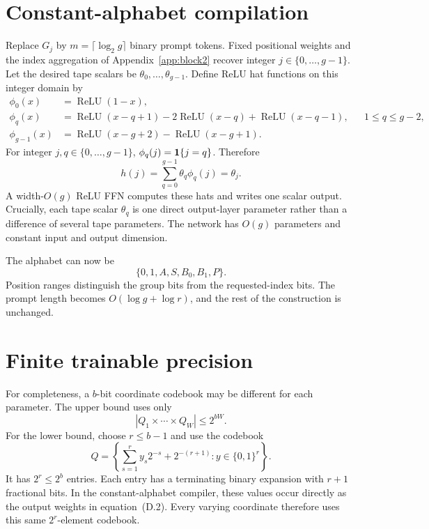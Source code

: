 \section{Constant-alphabet compilation}\label{app:constant-alphabet}

Replace $G_j$ by $m=\lceil\log_2g\rceil$ binary prompt tokens. Fixed positional weights and the
index aggregation of Appendix~\ref{app:block2} recover integer $j\in\{0,\ldots,g-1\}$. Let the
desired tape scalars be $\theta_0,\ldots,\theta_{g-1}$. Define ReLU hat functions on this integer
domain by
\begin{align}
 \phi_0(x)&=\operatorname{ReLU}(1-x),\nonumber\\
 \phi_q(x)&=\operatorname{ReLU}(x-q+1)-2\operatorname{ReLU}(x-q)
 +\operatorname{ReLU}(x-q-1), &&1\leq q\leq g-2,\nonumber\\
 \phi_{g-1}(x)&=\operatorname{ReLU}(x-g+2)-\operatorname{ReLU}(x-g+1).
 \tag{D.1}
\end{align}
For integer $j,q\in\{0,\ldots,g-1\}$, $\phi_q(j)=\mathbf 1\{j=q\}$. Therefore
\[
 h(j)=\sum_{q=0}^{g-1}\theta_q\phi_q(j)=\theta_j.
 \tag{D.2}
\]
A width-$O(g)$ ReLU FFN computes these hats and writes one scalar output. Crucially, each tape
scalar $\theta_q$ is one direct output-layer parameter rather than a difference of several tape
parameters. The network has $O(g)$ parameters and constant input and output dimension.

The alphabet can now be
\[
 \{0,1,A,S,B_0,B_1,P\}.
\]
Position ranges distinguish the group bits from the requested-index bits. The prompt length becomes
$O(\log g+\log r)$, and the rest of the construction is unchanged.

\section{Finite trainable precision}\label{app:precision}

For completeness, a $b$-bit coordinate codebook may be different for each parameter. The upper
bound uses only
\[
 |Q_1\times\cdots\times Q_W|\leq2^{bW}.
 \tag{E.1}
\]
For the lower bound, choose $r\leq b-1$ and use the codebook
\[
 Q=\left\{\sum_{s=1}^ry_s2^{-s}+2^{-(r+1)}:y\in\{0,1\}^r\right\}.
 \tag{E.2}
\]
It has $2^r\leq2^b$ entries. Each entry has a terminating binary expansion with $r+1$ fractional
bits. In the constant-alphabet compiler, these values occur directly as the output weights in
equation~(D.2). Every varying coordinate therefore uses this same $2^r$-element codebook.

